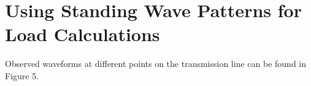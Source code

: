\documentclass[10pt]{article}
\newcommand{\oscope}[2] %
{
    \draw[thick,rotate=#2] (#1) circle (12pt)
    (#1) ++(-0.35,-0.1) -- ++(0.3,0.3) --++(0,-0.3)-- ++(0.3,0.3) --++(0,-0.3);
}
\begin{document}


\section{Using Standing Wave Patterns for Load Calculations}

Observed waveforms at different points on the transmission line can be found in Figure 5.
\end{document}
